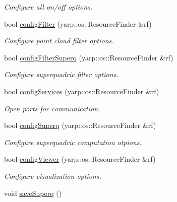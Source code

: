 \begin{DoxyCompactItemize}
\begin{DoxyCompactList}\small\item\em Configure all on/off options. \end{DoxyCompactList}\item 
bool \hyperlink{classSuperqModule_abe9bafeec746eb23da8f89cada86849e}{config\-Filter} (yarp\-::os\-::\-Resource\-Finder \&rf)\label{classSuperqModule_abe9bafeec746eb23da8f89cada86849e}

\begin{DoxyCompactList}\small\item\em Configure point cloud filter options. \end{DoxyCompactList}\item 
bool \hyperlink{classSuperqModule_a706feb064c09186585a97422603e6278}{config\-Filter\-Superq} (yarp\-::os\-::\-Resource\-Finder \&rf)\label{classSuperqModule_a706feb064c09186585a97422603e6278}

\begin{DoxyCompactList}\small\item\em Configure superquadric filter options. \end{DoxyCompactList}\item 
bool \hyperlink{classSuperqModule_aa27116ca1ef35ae86459aad82f4c53cb}{config\-Services} (yarp\-::os\-::\-Resource\-Finder \&rf)\label{classSuperqModule_aa27116ca1ef35ae86459aad82f4c53cb}

\begin{DoxyCompactList}\small\item\em Open ports for communication. \end{DoxyCompactList}\item 
bool \hyperlink{classSuperqModule_a36f445a18edc230bcd119b098143204f}{config\-Superq} (yarp\-::os\-::\-Resource\-Finder \&rf)\label{classSuperqModule_a36f445a18edc230bcd119b098143204f}

\begin{DoxyCompactList}\small\item\em Configure superquadric computation otpions. \end{DoxyCompactList}\item 
bool \hyperlink{classSuperqModule_ac92cfd73d4a1e08013051681ccb2e687}{config\-Viewer} (yarp\-::os\-::\-Resource\-Finder \&rf)\label{classSuperqModule_ac92cfd73d4a1e08013051681ccb2e687}

\begin{DoxyCompactList}\small\item\em Configure visualization options. \end{DoxyCompactList}\item 
void \hyperlink{classSuperqModule_ada9aa974cf680e4f6e5507c2dc463856}{save\-Superq} ()\label{classSuperqModule_ada9aa974cf680e4f6e5507c2dc463856}


\end{DoxyCompactItemize}
